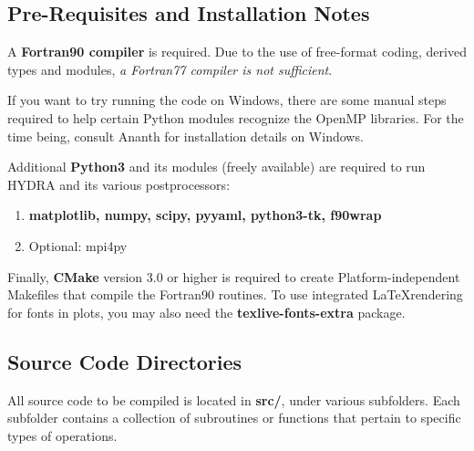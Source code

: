 \subsection{\textbf{Pre-Requisites and Installation Notes}}
A \textbf{Fortran90 compiler} is required. Due to the use of free-format coding, derived types and modules, \emph{a Fortran77 compiler is not sufficient}. 

If you want to try running the code on Windows, there are some manual steps required to help certain Python modules recognize the OpenMP libraries. For the time being, consult Ananth for installation details on Windows. 

Additional \textbf{Python3} and its modules (freely available) are required to run HYDRA and its various postprocessors:
\begin{enumerate}
	\item \textbf{matplotlib, numpy, scipy, pyyaml, python3-tk, f90wrap}
	\item Optional: mpi4py
\end{enumerate}

Finally, \textbf{CMake} version 3.0 or higher is required to create Platform-independent Makefiles that compile the Fortran90 routines. To use integrated \LaTeX rendering for fonts in plots, you may also need the \textbf{texlive-fonts-extra} package.

\subsection{\textbf{Source Code Directories}}
All source code to be compiled is located in \textbf{src/}, under various subfolders. Each subfolder contains a collection of subroutines or functions that pertain to specific types of operations. 

